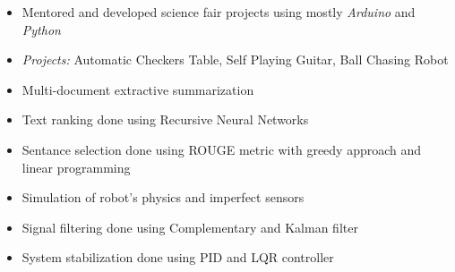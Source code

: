 \documentclass[10pt,a4paper]{altacv}
\begin{document}
\divider


\begin{itemize}
    \item \small{Mentored and developed science fair projects using mostly \textit{Arduino} and \textit{Python}}
    \item \small{\textit{Projects:} Automatic Checkers Table, Self Playing Guitar, Ball Chasing Robot}
\end{itemize}

\medskip





\begin{itemize}
  \item \small{Multi-document extractive summarization}
  \item \small{Text ranking done using Recursive Neural Networks}
  \item \small{Sentance selection done using ROUGE metric with greedy approach and linear programming}
\end{itemize}

\divider

%



\begin{itemize}
    \item \small{Simulation of robot's physics and imperfect sensors}
    \item \small{Signal filtering done using Complementary and Kalman filter}
    \item \small{System stabilization done using PID and LQR controller}
\end{itemize}
\end{document}
